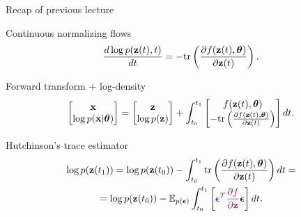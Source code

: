

\usepackage{tikz}

\usetikzlibrary{arrows,shapes,positioning,shadows,trees}

\begin{frame}
\titlepage
\end{frame}
\begin{frame}{Recap of previous lecture}
	\vspace{-0.5cm}
	\begin{block}{Continuous normalizing flows}
		\[
			\frac{d \log p(\mathbf{z}(t), t)}{d t} = - \text{tr} \left( \frac{\partial f (\mathbf{z}(t), \boldsymbol{\theta})}{\partial \mathbf{z}(t)} \right).
		\]
		\vspace{-0.5cm}
	\end{block}
	\begin{block}{Forward transform + log-density}
		\vspace{-0.4cm}
		\[
			\begin{bmatrix}
				\mathbf{x} \\
				\log p(\mathbf{x} | \boldsymbol{\theta})
			\end{bmatrix}
			= 
			\begin{bmatrix}
				\mathbf{z} \\
				\log p(\mathbf{z})
			\end{bmatrix} + 
			\int_{t_0}^{t_1} 
			\begin{bmatrix}
				f(\mathbf{z}(t), \boldsymbol{\theta}) \\
				- \text{tr} \left( \frac{\partial f(\mathbf{z}(t), \boldsymbol{\theta})}{\partial \mathbf{z}(t)} \right) 
			\end{bmatrix} dt.
		\]
		\vspace{-0.4cm}
	\end{block}	
	\begin{block}{Hutchinson's trace estimator}
		\vspace{-0.8cm}
		\begin{multline*}
		   \log p(\mathbf{z}(t_1)) = \log p(\mathbf{z}(t_0)) - \int_{t_0}^{t_1} \text{tr}  \left( \frac{\partial f (\mathbf{z}(t), \boldsymbol{\theta})}{\partial \mathbf{z}(t)} \right) dt = \\ = \log p(\mathbf{z}(t_0)) - \mathbb{E}_{p(\boldsymbol{\epsilon})} \int_{t_0}^{t_1} \left[ {\color{violet}\boldsymbol{\epsilon}^T \frac{\partial f}{\partial \mathbf{z}}} \boldsymbol{\epsilon} \right] dt.
		\end{multline*}
	\end{block}
\end{frame}
